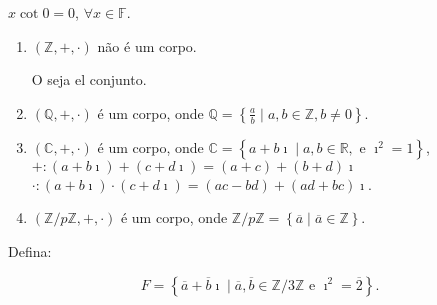 \begin{proposition}
	$x\cot0=0$, $\forall x\in\mathbb{F}$.
\end{proposition}

\begin{example}
	\begin{enumerate}
		\item

		      $\left(\mathbb{Z},+,\cdot\right)$ não é um corpo.

		      O seja el conjunto.

		\item

		      $\left(\mathbb{Q},+,\cdot\right)$ é um corpo, onde
		      $\mathbb{Q}=\left\{\frac{a}{b}\mid a,b\in\mathbb{Z},b\neq0\right\}$.

		\item

		      $\left(\mathbb{C},+,\cdot\right)$ é um corpo, onde
		      $\mathbb{C}=\left\{a+b\imath\mid a,b\in\mathbb{R},\text{ e }\imath^{2}=1\right\}$,
		      $+\colon\left(a+b\imath\right)+\left(c+d\imath\right)=\left(a+c\right)+\left(b+d\right)\imath$
		      $\cdot\colon\left(a+b\imath\right)\cdot\left(c+d\imath\right)=\left(ac-bd\right)+\left(ad+bc\right)\imath$.

		\item

		      $\left(\mathbb{Z}/p\mathbb{Z},+,\cdot\right)$ é um corpo, onde $\mathbb{Z}/p\mathbb{Z}=\left\{\overline{a}\mid \overline{a}\in\mathbb{Z}\right\}$.
	\end{enumerate}
\end{example}

Defina:

$$
	F=
	\left\{
	\overline{a}+\overline{b}\imath\mid
	\overline{a},\overline{b}\in\mathbb{Z}/3\mathbb{Z}
	\text{ e }\imath^{2}=\overline{2}
	\right\}.
$$


